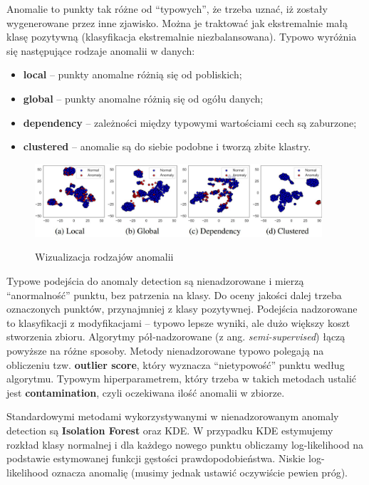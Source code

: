 \documentclass{myclass}
\numberwithin{equation}{subsection}
\begin{document}
Anomalie to punkty tak różne od \enquote{typowych}, że trzeba uznać, iż zostały wygenerowane przez
inne zjawisko. Można je traktować jak ekstremalnie małą klasę pozytywną (klasyfikacja ekstremalnie
niezbalansowana). Typowo wyróżnia się następujące rodzaje anomalii w danych:

\begin{itemize}
    
    \item \textbf{local} -- punkty anomalne różnią się od pobliskich;

    \item \textbf{global} -- punkty anomalne różnią się od ogółu danych;

    \item \textbf{dependency} -- zależności między typowymi wartościami cech są zaburzone;
    
    \item \textbf{clustered} -- anomalie są do siebie podobne i tworzą zbite klastry.
    
\end{itemize}

\begin{figure}[ht]
    \centering
    \includegraphics[width=0.95\textwidth]{figs/typesOfAnomalies.png}
    \label{fig:typesOfAnomalies}
    \caption{Wizualizacja rodzajów anomalii}
\end{figure}

Typowe podejścia do anomaly detection są nienadzorowane i mierzą \enquote{anormalność} punktu, bez
patrzenia na klasy. Do oceny jakości dalej trzeba oznaczonych punktów, przynajmniej z klasy
pozytywnej. Podejścia nadzorowane to klasyfikacji z modyfikacjami -- typowo lepsze wyniki, ale dużo
większy koszt stworzenia zbioru. Algorytmy pół-nadzorowane (z ang. \textit{semi-supervised}) łączą
powyższe na różne sposoby. Metody nienadzorowane typowo polegają na obliczeniu tzw. \textbf{outlier
score}, który wyznacza \enquote{nietypowość} punktu według algorytmu. Typowym hiperparametrem, który
trzeba w takich metodach ustalić jest \textbf{contamination}, czyli oczekiwana ilość anomalii w
zbiorze.

Standardowymi metodami wykorzystywanymi w nienadzorowanym anomaly detection są \textbf{Isolation
Forest} oraz KDE. W przypadku KDE estymujemy rozkład klasy normalnej i dla każdego nowego punktu
obliczamy log-likelihood na podstawie estymowanej funkcji gęstości prawdopodobieństwa. Niskie
log-likelihood oznacza anomalię (musimy jednak ustawić oczywiście pewien próg).
\end{document}
